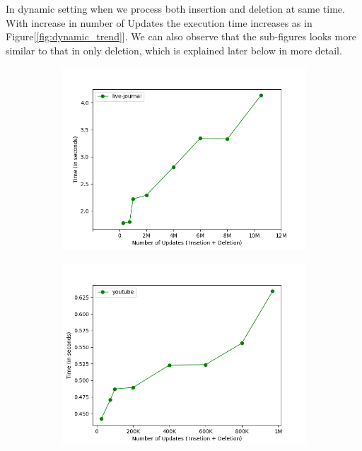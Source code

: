 \documentclass[a4paper]{article}
\begin{document}
In dynamic setting when we process both insertion and deletion at same time. With increase in number of Updates the execution time increases as in Figure[\ref{fig:dynamic_trend}]. We can also observe that the sub-figures looks more similar to that in only deletion, which is explained later below in more detail.
\begin{figure}[H]
    \centering
    \begin{subfigure}[b]{0.32\textwidth}
         \centering
         \includegraphics[width=\textwidth]{img/dyn/u1.png}
         \caption{}
         \label{fig:dynamic_trend_1}
    \end{subfigure}
    \hfill
    \begin{subfigure}[b]{0.32\textwidth}
         \centering
         \includegraphics[width=\textwidth]{img/dyn/u2.png}

\end{subfigure}
\end{figure}
\end{document}
